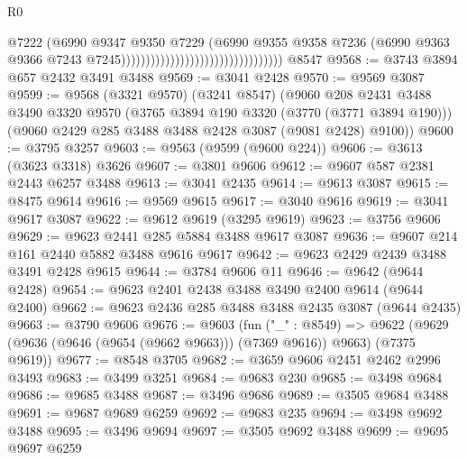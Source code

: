 \begin{lexlean}{R0}
\begin{coremodule}
                                                                @7222
                                                                (@6990
                                                                  @9347
                                                                  @9350
                                                                  @7229
                                                                  (@6990
                                                                    @9355
                                                                    @9358
                                                                    @7236
                                                                    (@6990
                                                                      @9363
                                                                      @9366
                                                                      @7243
                                                                      @7245)))))))))))))))))))))))))))))))))
    @8547
@9568 := @3743 @3894 @657 @2432 @3491 @3488
@9569 := @3041 @2428
@9570 := @9569 @3087
@9599 := @9568
    (@3321 @9570)
    (@3241 @8547)
    (@9060
      @208
      @2431
      @3488
      @3490
      @3320
      @9570
      (@3765 @3894 @190 @3320 (@3770 (@3771 @3894 @190)))
      (@9060 @2429 @285 @3488 @3488 @2428 @3087 (@9081 @2428) @9100))
@9600 := @3795 @3257
@9603 := @9563 (@9599 (@9600 @224))
@9606 := @3613 (@3623 @3318) @3626
@9607 := @3801 @9606
@9612 := @9607 @587 @2381 @2443 @6257 @3488
@9613 := @3041 @2435
@9614 := @9613 @3087
@9615 := @8475 @9614
@9616 := @9569 @9615
@9617 := @3040 @9616
@9619 := @3041 @9617 @3087
@9622 := @9612 @9619 (@3295 @9619)
@9623 := @3756 @9606
@9629 := @9623 @2441 @285 @5884 @3488 @9617 @3087
@9636 := @9607 @214 @161 @2440 @5882 @3488 @9616 @9617
@9642 := @9623 @2429 @2439 @3488 @3491 @2428 @9615
@9644 := @3784 @9606 @11
@9646 := @9642 (@9644 @2428)
@9654 := @9623 @2401 @2438 @3488 @3490 @2400 @9614 (@9644 @2400)
@9662 := @9623 @2436 @285 @3488 @3488 @2435 @3087 (@9644 @2435)
@9663 := @3790 @9606
@9676 := @9603
    (fun ("_" : @8549) =>
    @9622 (@9629 (@9636 (@9646 (@9654 (@9662 @9663))) (@7369 @9616)) @9663) (@7375 @9619))
@9677 := @8548 @3705
@9682 := @3659 @9606 @2451 @2462 @2996 @3493
@9683 := @3499 @3251
@9684 := @9683 @230
@9685 := @3498 @9684
@9686 := @9685 @3488
@9687 := @3496 @9686
@9689 := @3505 @9684 @3488
@9691 := @9687 @9689 @6259
@9692 := @9683 @235
@9694 := @3498 @9692 @3488
@9695 := @3496 @9694
@9697 := @3505 @9692 @3488
@9699 := @9695 @9697 @6259

\end{coremodule}
\end{lexlean}
